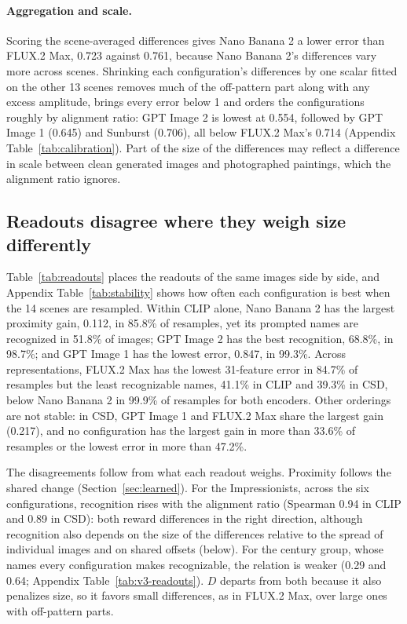 \documentclass[10pt]{article}
\begin{document}
\paragraph{Aggregation and scale.} Scoring the scene-averaged differences gives Nano Banana 2 a
lower error than FLUX.2 Max, 0.723 against 0.761, because Nano Banana 2's differences vary more
across scenes. Shrinking each configuration's differences by one scalar fitted on the other 13
scenes removes much of the off-pattern part along with any excess amplitude, brings every error
below 1 and orders the configurations roughly by alignment ratio: GPT Image 2 is lowest at 0.554,
followed by GPT Image 1 (0.645) and Sunburst (0.706), all below FLUX.2 Max's 0.714 (Appendix
Table~\ref{tab:calibration}). Part of the size of the differences may reflect a difference in scale
between clean generated images and photographed paintings, which the alignment ratio ignores.

\subsection{Readouts disagree where they weigh size differently}\label{sec:readouts}

Table~\ref{tab:readouts} places the readouts of the same images side by side, and Appendix
Table~\ref{tab:stability} shows how often each configuration is best when the 14 scenes are
resampled. Within CLIP alone, Nano Banana 2 has the largest proximity gain, 0.112, in 85.8\% of
resamples, yet its prompted names are recognized in 51.8\% of images; GPT Image 2 has the best
recognition, 68.8\%, in 98.7\%; and GPT Image 1 has the lowest error, 0.847, in 99.3\%. Across
representations, FLUX.2 Max has the lowest 31-feature error in 84.7\% of resamples but the least
recognizable names, 41.1\% in CLIP and 39.3\% in CSD, below Nano Banana 2 in 99.9\% of resamples for
both encoders. Other orderings are not stable: in CSD, GPT Image 1 and FLUX.2 Max share the largest
gain (0.217), and no configuration has the largest gain in more than 33.6\% of resamples or the
lowest error in more than 47.2\%.

The disagreements follow from what each readout weighs. Proximity follows the shared change
(Section~\ref{sec:learned}). For the Impressionists, across the six configurations, recognition
rises with the alignment ratio (Spearman 0.94 in CLIP and 0.89 in CSD): both reward differences in
the right direction, although recognition also depends on the size of the differences relative to
the spread of individual images and on shared offsets (below). For the century group, whose names
every configuration makes recognizable, the relation is weaker (0.29 and 0.64; Appendix
Table~\ref{tab:v3-readouts}). $D$ departs from both because it also penalizes
size, so it favors small differences, as in FLUX.2 Max, over large ones with off-pattern parts.
\end{document}

